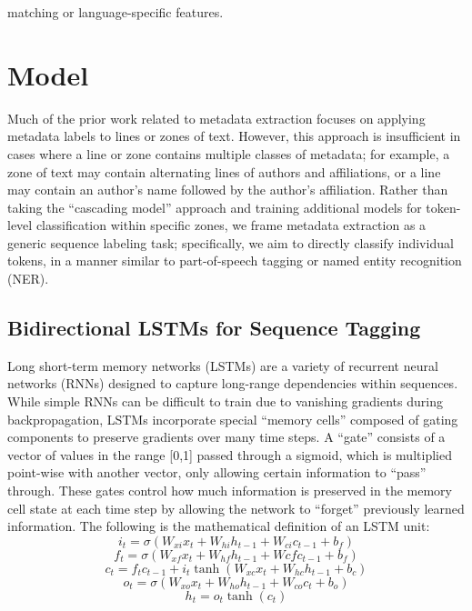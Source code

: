 \documentclass{acm_proc_article-sp}
\begin{document}
matching or language-specific features. \cite{lample2016neural}

\section{Model}
Much of the prior work related to metadata extraction focuses on applying metadata labels to lines or zones of text. However, this approach is insufficient in cases where a line or zone contains multiple classes of metadata; for example, a zone of text may contain alternating lines of authors and affiliations, or a line may contain an author’s name followed by the author’s affiliation. Rather than taking the “cascading model” approach and training additional models for token-level classification within specific zones, we frame metadata extraction as a generic sequence labeling task; specifically, we aim to directly classify individual tokens, in a manner similar to part-of-speech tagging or named entity recognition (NER). 

\subsection{Bidirectional LSTMs for Sequence Tagging}
Long short-term memory networks (LSTMs) are a variety of recurrent neural networks (RNNs) designed to capture long-range dependencies within sequences. While simple RNNs can be difficult to train due to vanishing gradients during backpropagation, LSTMs incorporate special “memory cells” composed of gating components to preserve gradients over many time steps. \cite{goldberg2016primer} A “gate” consists of a vector of values in the range [0,1] passed through a sigmoid, which is multiplied point-wise with another vector, only allowing certain information to “pass” through. These gates control how much information is preserved in the memory cell state at each time step by allowing the  network to “forget” previously learned information. The following is the mathematical definition of an LSTM unit:
\begin{equation}
    i_{t}=\sigma(W_{xi}x_{t}+W_{hi}h_{t-1}+W_{ci}c_{t-1}+b_f)
\end{equation}
\begin{equation}
    f_t=\sigma(W_{xf}x_{t}+W_{hf}h_{t-1}+W{cf}c_{t-1}+b_f)
\end{equation}
\begin{equation}
    c_t=f_tc_{t-1}+i_t\tanh(W_{xc}x_t+W_{hc}h_{t-1}+b_c)
\end{equation}
\begin{equation}
    o_t=\sigma(W_{xo}x_t+W_{ho}h_{t-1}+W_{co}c_t+b_o)
\end{equation}
\begin{equation}
    h_t=o_t\tanh(c_t)
\end{equation}
\end{document}
